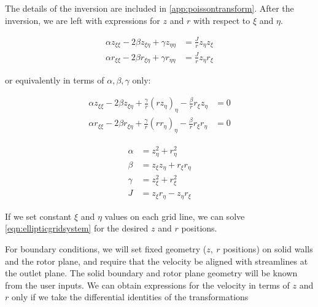 
The details of the inversion are included in \cref{app:poissontransform}.
%
After the inversion, we are left with expressions for \(z\) and \(r\) with respect to \(\xi\) and \(\eta\).%

\begin{align}
    \alpha z_{\xi\xi} - 2 \beta z_{\xi\eta} + \gamma z_{\eta\eta}    &= \frac{J}{r} z_\eta z_\xi \\
    \alpha r_{\xi\xi} - 2 \beta r_{\xi\eta} + \gamma r_{\eta\eta}    &= \frac{J}{r} z_\eta r_\xi
\end{align}


\noindent or equivalently in terms of \(\alpha, \beta, \gamma\) only:

\begin{equation}
\label{eqn:ellipticgridsystem}
    \begin{aligned}
        \alpha z_{\xi\xi} - 2 \beta z_{\xi\eta} + \frac{\gamma}{r} \left(r z_{\eta}\right)_\eta - \frac{\beta}{r} r_\xi z_\eta &= 0 \\
        \alpha r_{\xi\xi} - 2 \beta r_{\xi\eta} + \frac{\gamma}{r} \left(r r_{\eta}\right)_\eta - \frac{\beta}{r}  r_\xi r_\eta &= 0
    \end{aligned}
\end{equation}

\where

\begin{align}
    \alpha &= z_\eta^2 + r_\eta^2 \\
    \beta &= z_\xi z_\eta + r_\xi r_\eta \\
    \gamma &= z_\xi^2 + r_\xi^2 \\
    J &= z_\xi r_\eta - z_\eta r_\xi
\end{align}

\noindent If we set constant \(\xi\) and \(\eta\) values on each grid line, we can solve \cref{eqn:ellipticgridsystem} for the desired \(z\) and \(r\) positions.

For boundary conditions, we will set fixed geometry (\(z,~r\) positions) on solid walls and the rotor plane, and require that the velocity be aligned with streamlines at the outlet plane.
%
The solid boundary and rotor plane geometry will be known from the user inputs.
%
We can obtain expressions for the velocity in terms of \(z\) and \(r\) only if we take the differential identities of the transformations

